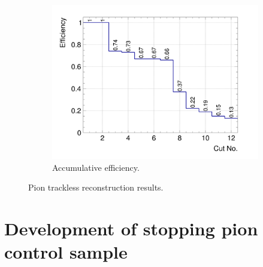 \begin{figure}[t]
\begin{subfigure}{\trfigwid\textwidth}
                   \label{fig:ppi-res}
              \end{subfigure}
              \begin{subfigure}{\trfigwid\textwidth}
                   \includegraphics[width=\textwidth]{figures/sel/INCL_p_pi_accum_eff_al11.png}
                   \caption{Accumulative efficiency.}
                   \label{fig:tl-accum-eff}
              \end{subfigure}
              \caption{Pion trackless reconstruction results.}
              \label{fig:piTLres}
           \end{figure}


    \section{Development of stopping pion control sample}

